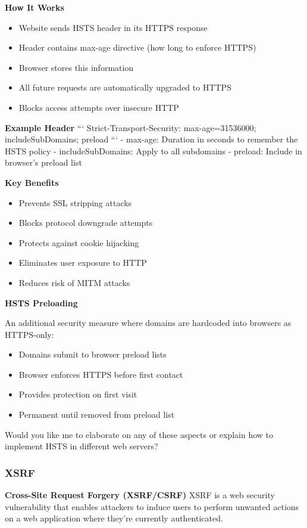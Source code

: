 \textbf{How It Works}
\begin{itemize}
    \item Website sends HSTS header in its HTTPS response
    \item Header contains max-age directive (how long to enforce HTTPS)
    \item Browser stores this information
    \item All future requests are automatically upgraded to HTTPS
    \item Blocks access attempts over insecure HTTP
\end{itemize}

\textbf{Example Header}
```
Strict-Transport-Security: max-age=31536000; includeSubDomains; preload
```
- max-age: Duration in seconds to remember the HSTS policy
- includeSubDomains: Apply to all subdomains
- preload: Include in browser's preload list

\textbf{Key Benefits}
\begin{itemize}
    \item Prevents SSL stripping attacks
    \item Blocks protocol downgrade attempts
    \item Protects against cookie hijacking
    \item Eliminates user exposure to HTTP
    \item Reduces risk of MITM attacks
\end{itemize}

\textbf{HSTS Preloading}

An additional security measure where domains are hardcoded into browsers as HTTPS-only:
\begin{itemize}
    \item Domains submit to browser preload lists
    \item Browser enforces HTTPS before first contact
    \item Provides protection on first visit
    \item Permanent until removed from preload list
\end{itemize}

Would you like me to elaborate on any of these aspects or explain how to implement HSTS in different web servers?

\subsubsection{XSRF}
\textbf{Cross-Site Request Forgery (XSRF/CSRF)}
XSRF is a web security vulnerability that enables attackers to induce users to perform unwanted actions on a web application where they're currently authenticated.

